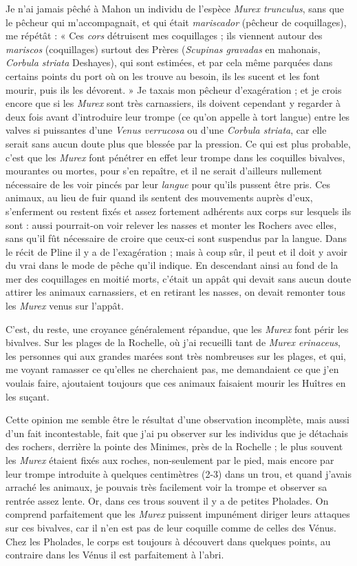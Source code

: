 \documentclass[a4paper, 11pt, oneside, polutonikogreek, french]{article}
\begin{document}
Je n'ai jamais pêché à Mahon un individu de l'espèce \emph{Murex trunculus}, sans que le pêcheur qui m'accompagnait, et qui était \emph{mariscador} (pêcheur de coquillages), me répétât : « Ces \emph{cors} détruisent mes coquillages ; ils viennent autour des \emph{mariscos} (coquillages) surtout des Prères (\emph{Scupinas gravadas} en mahonais, \emph{Corbula striata} Deshayes), qui sont estimées, et par cela même parquées dans certains points du port où on les trouve au besoin, ils les sucent et les font mourir, puis ils les dévorent. » Je taxais mon pêcheur d'exagération ; et je crois encore que si les \emph{Murex} sont très carnassiers, ils doivent cependant y regarder à deux fois avant d'introduire leur trompe (ce qu'on appelle à tort langue) entre les valves si puissantes d'une \emph{Venus verrucosa} ou d'une \emph{Corbula striata}, car elle serait sans aucun doute plus que blessée par la pression. Ce qui est plus probable, c'est que les \emph{Murex} font pénétrer en effet leur trompe dans les coquilles bivalves, mourantes ou mortes, pour s'en repaître, et il ne serait d'ailleurs nullement nécessaire de les voir pincés par leur \emph{langue} pour qu'ils pussent être pris. Ces animaux, au lieu de fuir quand ils sentent des mouvements auprès d'eux, s'enferment ou restent fixés et assez fortement adhérents aux corps sur lesquels ils sont : aussi pourrait-on voir relever les nasses et monter les Rochers avec elles, sans qu'il fût nécessaire de croire que ceux-ci sont suspendus par la langue. Dans le récit de Pline il y a de l'exagération ; mais à coup sûr, il peut et il doit y avoir du vrai dans le mode de pêche qu'il indique. En descendant ainsi au fond de la mer des coquillages en moitié morts, c'était un appât qui devait sans aucun doute attirer les animaux carnassiers, et en retirant les nasses, on devait remonter tous les \emph{Murex} venus sur l'appât.

C'est, du reste, une croyance généralement répandue, que les \emph{Murex} font périr les bivalves. Sur les plages de la Rochelle, où j'ai recueilli tant de \emph{Murex erinaceus}, les personnes qui aux grandes marées sont très nombreuses sur les plages, et qui, me voyant ramasser ce qu'elles ne cherchaient pas, me demandaient ce que j'en voulais faire, ajoutaient toujours que ces animaux faisaient mourir les Huîtres en les suçant.

Cette opinion me semble être le résultat d'une observation incomplète, mais aussi d'un fait incontestable, fait que j'ai pu observer sur les individus que je détachais des rochers, derrière la pointe des Minimes, près de la Rochelle ; le plus souvent les \emph{Murex} étaient fixés aux roches, non-seulement par le pied, mais encore par leur trompe introduite à quelques centimètres (2-3) dans un trou, et quand j'avais arraché les animaux, je pouvais très facilement voir la trompe et observer sa rentrée assez lente. Or, dans ces trous souvent il y a de petites Pholades. On comprend parfaitement que les \emph{Murex} puissent impunément diriger leurs attaques sur ces bivalves, car il n'en est pas de leur coquille comme de celles des Vénus. Chez les Pholades, le corps est toujours à découvert dans quelques points, au contraire dans les Vénus il est parfaitement à l'abri.
\end{document}
